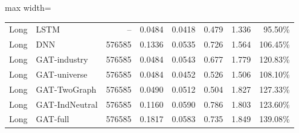 \begin{table}[H]
\begin{adjustbox}{max width=\textwidth}
\begin{tabular}{llrrrrrr}
Long & LSTM & -- & 0.0484 & 0.0418 & 0.479 & 1.336 & 95.50\% \\
Long & DNN & 576585 & 0.1336 & 0.0535 & 0.726 & 1.564 & 106.45\% \\
Long & GAT-industry & 576585 & 0.0484 & 0.0543 & 0.677 & 1.779 & 120.83\% \\
Long & GAT-universe & 576585 & 0.0484 & 0.0452 & 0.526 & 1.506 & 108.10\% \\
Long & GAT-TwoGraph & 576585 & 0.0490 & 0.0512 & 0.504 & 1.827 & 127.33\% \\
Long & GAT-IndNeutral & 576585 & 0.1160 & 0.0590 & 0.786 & 1.803 & 123.60\% \\
Long & GAT-full & 576585 & 0.1817 & 0.0583 & 0.735 & 1.849 & 139.08\% \\
\bottomrule
\end{tabular}
\end{adjustbox}
\end{table}
